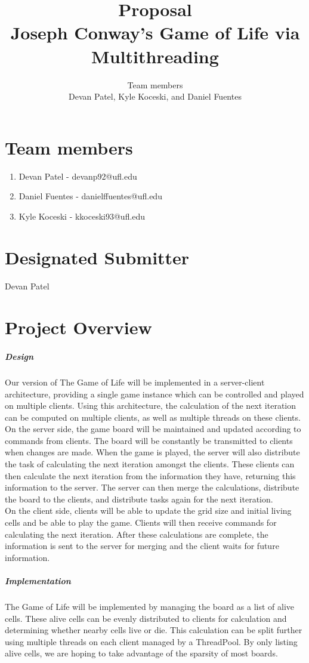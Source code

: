 \documentclass[12pt,a4paper]{report}
\author{Team members \\{\normalsize Devan Patel, Kyle Koceski, and Daniel Fuentes}}
\title{Proposal \\ {\large Joseph Conway's Game of Life via Multithreading} }
\begin{document}
\maketitle
\newpage
\section{Team members}
\begin{enumerate}
\item Devan Patel - devanp92@ufl.edu
\item Daniel Fuentes - danielffuentes@ufl.edu
\item Kyle Koceski - kkoceski93@ufl.edu
\end{enumerate}
\section{Designated Submitter}
\paragraph{}
Devan Patel
\section{Project Overview}
\subparagraph{Design}
Our version of The Game of Life will be implemented in a server-client architecture, providing a single game instance which can be controlled and played on multiple clients. Using this architecture, the calculation of the next iteration can be computed on multiple clients, as well as multiple threads on these clients. \\

On the server side, the game board will be maintained and updated according to commands from clients. The board will be constantly be transmitted to clients when changes are made. When the game is played, the server will also distribute the task of calculating the next iteration amongst the clients. These clients can then calculate the next iteration from the information they have, returning this information to the server. The server can then merge the calculations, distribute the board to the clients, and distribute tasks again for the next iteration. \\

On the client side, clients will be able to update the grid size and initial living cells and be able to play the game. Clients will then receive commands for calculating the next iteration. After these calculations are complete, the information is sent to the server for merging and the client waits for future information. 
\subparagraph*{Implementation} 
The Game of Life will be implemented by managing the board as a list of alive cells. These alive cells can be evenly distributed to clients for calculation and determining whether nearby cells live or die. This calculation can be split further using multiple threads on each client managed by a ThreadPool. By only listing alive cells, we are hoping to take advantage of the sparsity of most boards.
\end{document}
